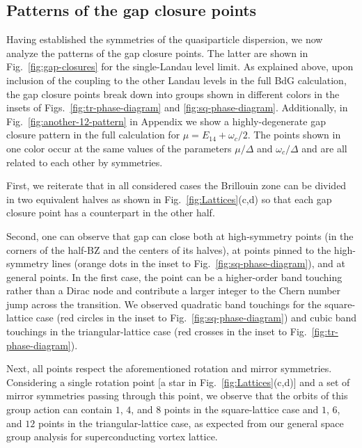 \documentclass[10pt,prb,aps,superscriptaddress,amsmath,amssymb,twocolumn,floatfix,longbibliography]{revtex4-1}
\begin{document}
\subsection{Patterns of the gap closure points}
\label{secsec:patterns}

Having established the symmetries of the quasiparticle dispersion, we now analyze the patterns of the gap closure points. 
The latter are shown in Fig.~\ref{fig:gap-closures} for the single-Landau level limit. As explained above, upon inclusion of the coupling to the other Landau levels in the full BdG calculation, the gap closure points break down into groups shown in different colors in the insets of Figs.~\ref{fig:tr-phase-diagram} and \ref{fig:sq-phase-diagram}. Additionally, in Fig.~\ref{fig:another-12-pattern} in Appendix we show a highly-degenerate gap closure pattern in the full calculation for $\mu = E_{14} + \omega_c / 2$.  The points shown in one color occur at the same values of the parameters $\mu / \Delta$ and $\omega_c / \Delta$ and are all related to each other by symmetries.

First, we reiterate that in all considered cases the Brillouin zone can be divided in two equivalent halves as shown in Fig.~\ref{fig:Lattices}(c,d) so that each gap closure point has a counterpart in the other half. 

Second, one can observe that gap can close both at high-symmetry points (in the corners of the half-BZ and the centers of its halves), at points pinned to the high-symmetry lines (orange dots in the inset to Fig.~\ref{fig:sq-phase-diagram}), and at general points. In the first case, the point can be a higher-order band touching rather than a Dirac node and contribute a larger integer to the Chern number jump across the transition. We observed quadratic band touchings for the square-lattice case (red circles in the inset to Fig.~\ref{fig:sq-phase-diagram}) and cubic band touchings in the triangular-lattice case (red crosses in the inset to Fig.~\ref{fig:tr-phase-diagram}).

Next, all points respect the aforementioned rotation and mirror symmetries. Considering a single rotation point [a star in Fig.~\ref{fig:Lattices}(c,d)] and a set of mirror symmetries passing through this point, 
we observe that the orbits of this group action can contain $1$, $4$, and $8$ points in the square-lattice case and $1$, $6$, and $12$ points in the triangular-lattice case, as expected from our general space group analysis for superconducting vortex lattice.
\end{document}
